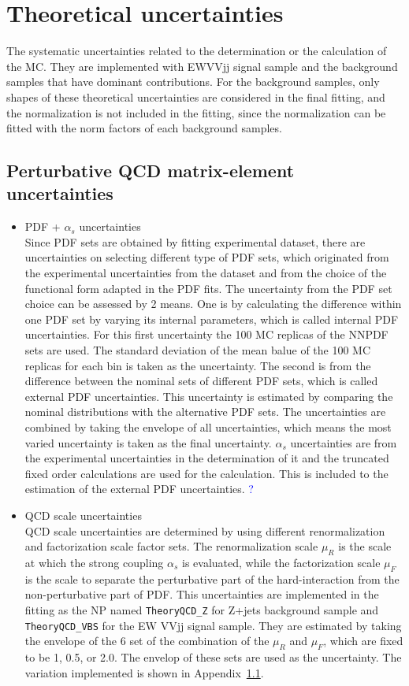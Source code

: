 \section{Theoretical uncertainties}
The systematic uncertainties related to the determination or the calculation of the MC.
They are implemented with EWVVjj signal sample and the background samples that have dominant contributions. For the background samples, only shapes of these theoretical uncertainties are considered in the final fitting, and the normalization is not included in the fitting, since the normalization can be fitted with the norm factors of each background samples.
\subsection{Perturbative QCD matrix-element uncertainties}
\begin{itemize}
\item PDF + $\alpha_s$ uncertainties\\
Since PDF sets are obtained by fitting experimental dataset, there are uncertainties on selecting different type of PDF sets, which originated from the experimental uncertainties from the dataset and from the choice of the functional form adapted in the PDF fits.
The uncertainty from the PDF set choice can be assessed by 2 means. One is by calculating the difference within one PDF set by varying its internal parameters, which is called internal PDF uncertainties. For this first uncertainty the 100 MC replicas of the NNPDF sets are used. The standard deviation of the mean balue of the 100 MC replicas for each bin is taken as the uncertainty. The second is from the difference between the nominal sets of different PDF sets, which is called external PDF uncertainties. This uncertainty is estimated by comparing the nominal distributions with the alternative PDF sets. The uncertainties are combined by taking the envelope of all uncertainties, which means the most varied uncertainty is taken as the final uncertainty. 
$\alpha_s$ uncertainties are from the experimental uncertainties in the determination of it and the truncated fixed order calculations are used for the calculation. This is included to the estimation of the external PDF uncertainties. \textcolor{blue}{?}
\item QCD scale uncertainties\\
QCD scale uncertainties are determined by using different renormalization and factorization scale factor sets. 
The renormalization scale $\mu_R$ is the scale at which the strong coupling $\alpha_s$ is evaluated, while the factorization scale $\mu_F$ is the scale to separate the perturbative part of the hard-interaction from the non-perturbative part of PDF. 
This uncertainties are implemented in the fitting as the NP named \texttt{TheoryQCD\_Z} for Z+jets background sample and \texttt{TheoryQCD\_VBS} for the EW VVjj signal sample. They are estimated by taking the envelope of the 6 set of the combination of the $\mu_R$ and $\mu_F$, which are fixed to be 1, 0.5, or 2.0. The envelop of these sets are used as the uncertainty.
The variation implemented is shown in Appendix~\ref{}. 
\end{itemize}

